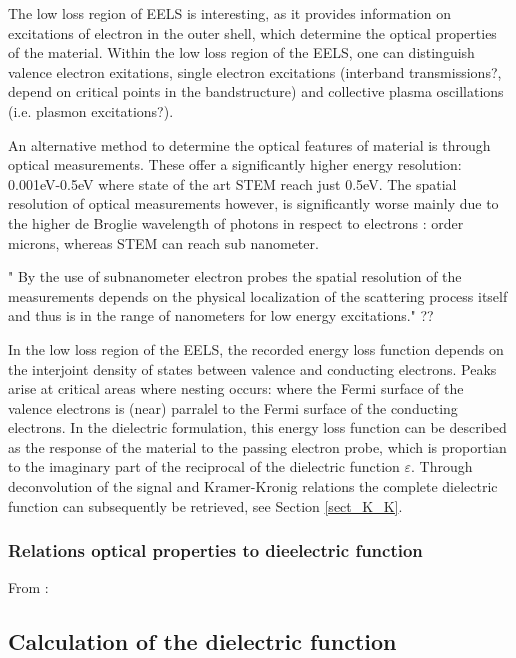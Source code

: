 The low loss region of EELS is interesting, as it provides information on excitations of electron in the outer shell, which determine the optical properties of the material. Within the low loss region of the EELS, one can distinguish valence electron exitations, single electron excitations (interband transmissions?, depend on critical points in the bandstructure) and collective plasma oscillations (i.e. plasmon excitations?). 

An alternative method to determine the optical features of material is through optical measurements. These offer a significantly higher energy resolution: 0.001eV-0.5eV where state of the art STEM reach just 0.5eV. The spatial resolution of optical measurements however, is significantly worse mainly due to the higher de Broglie wavelength of photons in respect to electrons \cite{iets}: order microns, whereas STEM can reach sub nanometer.


"
By the use of subnanometer electron probes the spatial resolution of the measurements depends on the physical localization of the scattering process itself and thus is in the range of nanometers for low energy excitations." ?? 


In the low loss region of the EELS, the recorded energy loss function depends on the interjoint density of states between valence and conducting electrons. Peaks arise at critical areas where nesting occurs: where the Fermi surface of the valence electrons is (near) parralel to the Fermi surface of the conducting electrons. In the dielectric formulation, this energy loss function can be described as the response of the material to the passing electron probe, which is proportian to the imaginary part of the reciprocal of the dielectric function $\varepsilon$. Through deconvolution of the signal and Kramer-Kronig relations the complete dielectric function can subsequently be retrieved, see Section \ref{sect_K_K}.





\subsubsection{Relations optical properties to dieelectric function}
From \cite{brockt_lakner_2000}:




\subsection{Calculation of the dielectric function}



